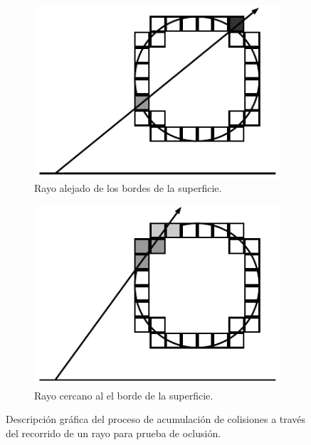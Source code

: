 \begin{figure}[H]
	\centering
	\begin{subfigure}[t]{0.49\textwidth}
		\centering
		\captionsetup{justification=centering}
		\includegraphics[width=\linewidth]{media/shadow_tracer.pdf}
		\caption*{Rayo alejado de los bordes de la superficie.}
	\end{subfigure}%
	\hspace{0.01\textwidth}
	\begin{subfigure}[t]{0.49\textwidth}
		\centering
		\captionsetup{justification=centering}
		\includegraphics[width=\linewidth]{media/shadow_trace_corner.pdf}
		\caption*{Rayo cercano al el borde de la superficie.}
	\end{subfigure}%
	\caption{Descripción gráfica del proceso de acumulación de colisiones a través del recorrido de un rayo para prueba de oclusión.}
	\label{fig:soft_voxel_shadow}
\end{figure}

